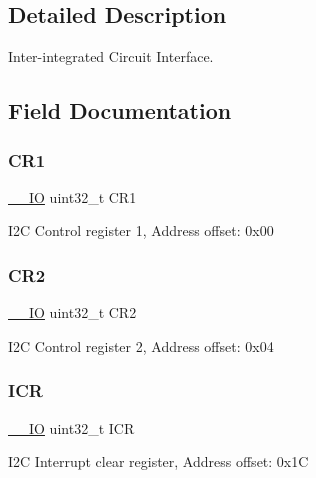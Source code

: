 \subsection{Detailed Description}
Inter-\/integrated Circuit Interface. 

\subsection{Field Documentation}
\mbox{\label{struct_i2_c___type_def_ab0ec7102960640751d44e92ddac994f0}} 
\subsubsection{\texorpdfstring{C\+R1}{CR1}}
{\footnotesize\ttfamily \hyperlink{core__sc300_8h_aec43007d9998a0a0e01faede4133d6be}{\+\_\+\+\_\+\+IO} uint32\+\_\+t C\+R1}

I2C Control register 1, Address offset\+: 0x00 \mbox{\label{struct_i2_c___type_def_afdfa307571967afb1d97943e982b6586}} 
\subsubsection{\texorpdfstring{C\+R2}{CR2}}
{\footnotesize\ttfamily \hyperlink{core__sc300_8h_aec43007d9998a0a0e01faede4133d6be}{\+\_\+\+\_\+\+IO} uint32\+\_\+t C\+R2}

I2C Control register 2, Address offset\+: 0x04 \mbox{\label{struct_i2_c___type_def_a0a8c8230846fd8ff154b9fde8dfa0399}} 
\subsubsection{\texorpdfstring{I\+CR}{ICR}}
{\footnotesize\ttfamily \hyperlink{core__sc300_8h_aec43007d9998a0a0e01faede4133d6be}{\+\_\+\+\_\+\+IO} uint32\+\_\+t I\+CR}

I2C Interrupt clear register, Address offset\+: 0x1C \mbox{\label{struct_i2_c___type_def_ab3c49a96815fcbee63d95e1e74f20e75}} 
